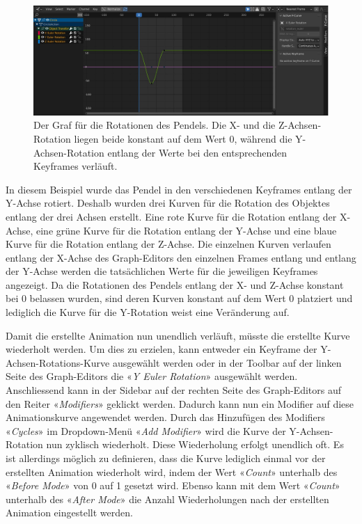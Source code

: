 \documentclass[
]{book}
\let\oldmarginnote\marginnote
\renewcommand{\marginnote}[1]{%
  \oldmarginnote{{\footnotesize\selectfont #1}}%
}
\begin{document}
\begin{figure}[H]

{\centering \includegraphics{Chapters/Images/Chapter_48/48_2_Pendel_Rotation.jpg}

}

\caption{Der Graf für die Rotationen des Pendels. Die X- und die
Z-Achsen-Rotation liegen beide konstant auf dem Wert 0, während die
Y-Achsen-Rotation entlang der Werte bei den entsprechenden Keyframes
verläuft.}

\end{figure}%

\marginnote{Kurven im Graph-Editor}

In diesem Beispiel wurde das Pendel in den verschiedenen Keyframes
entlang der Y-Achse rotiert. Deshalb wurden drei Kurven für die Rotation
des Objektes entlang der drei Achsen erstellt. Eine rote Kurve für die
Rotation entlang der X-Achse, eine grüne Kurve für die Rotation entlang
der Y-Achse und eine blaue Kurve für die Rotation entlang der Z-Achse.
Die einzelnen Kurven verlaufen entlang der X-Achse des Graph-Editors den
einzelnen Frames entlang und entlang der Y-Achse werden die
tatsächlichen Werte für die jeweiligen Keyframes angezeigt. Da die
Rotationen des Pendels entlang der X- und Z-Achse konstant bei 0
belassen wurden, sind deren Kurven konstant auf dem Wert 0 platziert und
lediglich die Kurve für die Y-Rotation weist eine Veränderung auf.

\marginnote{Cycles-Modifier}

Damit die erstellte Animation nun unendlich verläuft, müsste die
erstellte Kurve wiederholt werden. Um dies zu erzielen, kann entweder
ein Keyframe der Y-Achsen-Rotations-Kurve ausgewählt werden oder in der
Toolbar auf der linken Seite des Graph-Editors die «\emph{Y Euler
Rotation}» ausgewählt werden. Anschliessend kann in der Sidebar auf der
rechten Seite des Graph-Editors auf den Reiter «\emph{Modifiers}»
geklickt werden. Dadurch kann nun ein Modifier auf diese Animationskurve
angewendet werden. Durch das Hinzufügen des Modifiers «\emph{Cycles}» im
Dropdown-Menü «\emph{Add Modifier}» wird die Kurve der Y-Achsen-Rotation
nun zyklisch wiederholt. Diese Wiederholung erfolgt unendlich oft. Es
ist allerdings möglich zu definieren, dass die Kurve lediglich einmal
vor der erstellten Animation wiederholt wird, indem der Wert
«\emph{Count}» unterhalb des «\emph{Before Mode}» von 0 auf 1 gesetzt
wird. Ebenso kann mit dem Wert «\emph{Count}» unterhalb des «\emph{After
Mode}» die Anzahl Wiederholungen nach der erstellten Animation
eingestellt werden.
\end{document}
